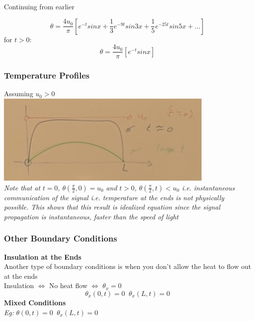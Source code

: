 \documentclass[11pt]{article}
\theoremstyle{definition}
\begin{document}
Continuing from earlier

$$\theta = \frac{4u_0}{\pi}[e^{-t}sinx + \frac{1}{3}e^{-9t}sin3x + \frac{1}{5}e^{-25t}sin5x + \dots]$$
for $t > 0$:
$$\theta = \frac{4u_0}{\pi}[e^{-t}sinx]$$

\subsubsection{Temperature Profiles}
Assuming $u_0 > 0$\\
\includegraphics[]{MVIMG_20181127_084026.jpg}\\
\textit{Note that at $t=0$, $\theta(\frac{\pi}{2},0) = u_0$ and $t>0$, $\theta(\frac{\pi}{2},t) < u_0$ i.e. instantaneous communication of the signal i.e. temperature at the ends is not physically possible. This shows that this result is idealized equation since the signal propagation is instantaneous, faster than the speed of light}\\
\subsubsection{Other Boundary Conditions}
\textbf{Insulation at the Ends}\\
Another type of boundary conditions is when you don't allow the heat to flow out at the ends
\\
Insulation $\Longleftrightarrow$ No heat flow $\Longleftrightarrow$ $\theta_x = 0$
$$\theta_x(0,t) = 0\; \; \theta_x(L,t) = 0$$
\textbf{Mixed Conditions}\\
\textit{Eg:} $\theta(0,t) = 0\;\; \theta_x(L,t) = 0$
\end{document}
